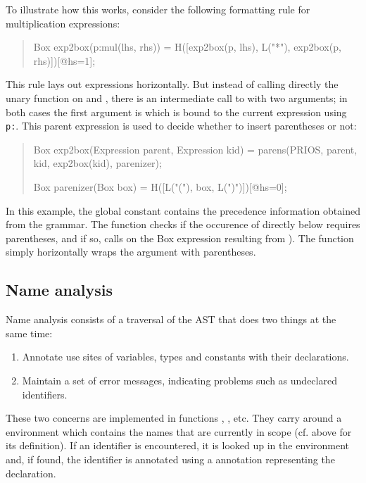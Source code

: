 To illustrate how this works, consider the following formatting rule
for multiplication expressions:
\begin{quote}
\begin{rascal}
Box exp2box(p:mul(lhs, rhs)) = 
    H([exp2box(p, lhs), L("*"), exp2box(p, rhs)])[@hs=1];
\end{rascal}
\end{quote}
This rule lays out expressions horizontally. But instead of calling
directly the unary function  on  and
, there is an intermediate call to  with
two arguments; in both cases the first argument is  which
is bound to the current expression using \texttt{p:}. This parent
expression is used to decide whether to insert parentheses or not:
\begin{quote}
\begin{rascal}
Box exp2box(Expression parent, Expression kid) =
    parens(PRIOS, parent, kid, exp2box(kid), parenizer);

Box parenizer(Box box) = H([L("("), box, L(")")])[@hs=0];
\end{rascal}
\end{quote}
In this example, the global constant  contains
the precedence information obtained from the grammar. The
 function checks if the occurence of 
directly below  requires parentheses, and if so, calls
 on the Box expression resulting from
). The function  simply
horizontally wraps the argument with parentheses.


\subsection{Name analysis}

\noindent Name analysis consists of a traversal of the AST that does
two things at the same time:
\begin{enumerate}
\item Annotate use sites of variables, types and constants with
  their declarations.
\item Maintain a set of error messages, indicating problems such as
  undeclared identifiers. 
\end{enumerate}
These two concerns are implemented in functions ,
,  etc. They carry around a
 environment which contains the names that are currently
in scope (cf. above for its definition). If an identifier is
encountered, it is looked up in the environment and, if found, the
identifier is annotated using a \Rascal annotation representing the
declaration.

